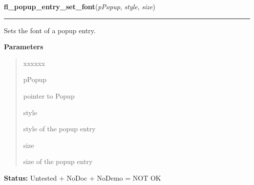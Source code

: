     \label{xformslib:flpopup:fl_popup_entry_set_font}

    \vspace{0.5ex}

\hspace{.8\funcindent}\begin{boxedminipage}{\funcwidth}

    \raggedright \textbf{fl\_popup\_entry\_set\_font}(\textit{pPopup}, \textit{style}, \textit{size})

    \vspace{-1.5ex}

    \rule{\textwidth}{0.5\fboxrule}
\setlength{\parskip}{2ex}
    Sets the font of a popup entry.

\setlength{\parskip}{1ex}
      \textbf{Parameters}
      \vspace{-1ex}

      \begin{quote}
        \begin{Ventry}{xxxxxx}

          \item[pPopup]

          pointer to Popup

          \item[style]

          style of the popup entry

          \item[size]

          size of the popup entry

        \end{Ventry}

      \end{quote}

\textbf{Status:} Untested + NoDoc + NoDemo = NOT OK



    \end{boxedminipage}

    \label{xformslib:flpopup:fl_popup_get_bw}

    \vspace{0.5ex}

